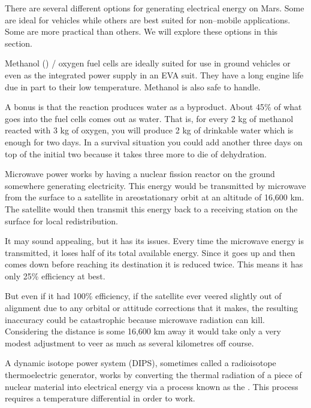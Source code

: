 

There are several different options for generating electrical energy on Mars. Some are ideal for vehicles while others are best suited for non--mobile applications. Some are more practical than others. We will explore these options in this section.

Methanol () / oxygen fuel cells are ideally suited for use in ground vehicles or even as the integrated power supply in an EVA suit. They have a long engine life due in part to their low temperature. Methanol is also safe to handle. 

A bonus is that the reaction produces water as a byproduct. About 45\% of what goes into the fuel cells comes out as water. That is, for every 2 kg of methanol reacted with 3 kg of oxygen, you will produce 2 kg of drinkable water which is enough for two days. In a survival situation you could add another three days on top of the initial two because it takes three more to die of dehydration.

Microwave power works by having a nuclear fission reactor on the ground somewhere generating electricity. This energy would be transmitted by microwave from the surface to a satellite in areostationary orbit at an altitude of 16,600 km. The satellite would then transmit this energy back to a receiving station on the surface for local redistribution.

It may sound appealing, but it has its issues. Every time the microwave energy is transmitted, it loses half of its total available energy. Since it goes up and then comes down before reaching its destination it is reduced twice. This means it has only 25\% efficiency at best.

But even if it had 100\% efficiency, if the satellite ever veered slightly out of alignment due to any orbital or attitude corrections that it makes, the resulting inaccuracy could be catastrophic because microwave radiation can kill. Considering the distance is some 16,600 km away it would take only a very modest adjustment to veer as much as several kilometres off course.

A dynamic isotope power system (DIPS), sometimes called a radioisotope thermoelectric generator, works by converting the thermal radiation of a piece of nuclear material into electrical energy via a process known as the . This process requires a temperature differential in order to work.

